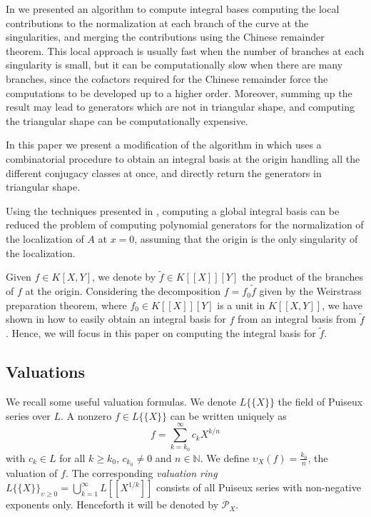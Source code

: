 \documentclass[a4paper,11pt]{amsart}%
\theoremstyle{definition}
\theoremstyle{plain}
\theoremstyle{remark}
\newcommand{\N}{{\mathbb N}}
\begin{document}
In \cite{intbas} we presented an algorithm to compute integral bases computing the local contributions to the normalization at each branch of the curve at the singularities, and merging the contributions using the Chinese remainder theorem. This local approach is usually fast when the number of branches at each singularity is small, but it can be computationally
slow when there are many branches, since the cofactors required for the Chinese remainder force the computations to be developed up to a higher order. Moreover, summing up the result may lead to generators which are not in triangular shape, and computing the triangular shape can be computationally expensive.

In this paper we present a modification of the algorithm in \cite{intbas} which uses a combinatorial procedure to obtain an integral basis at the origin
handling all the different conjugacy classes at once, and directly return the generators in triangular shape.

Using the techniques presented in \cite{intbas}, computing a global integral basis can be reduced the problem of computing polynomial generators for the normalization of the localization of $A$ at $x = 0$, assuming that the origin is the only singularity of the localization.



Given $f \in K[X,Y]$, we denote by $\tilde f \in K[[X]][Y]$ the product of the branches of $f$ at the origin. Considering the decomposition $f = f_0 \tilde f$ given by the Weirstrass preparation theorem, where $f_0 \in K[[X]][Y]$ is a unit in $K[[X,Y]]$, we have shown in \cite[Proposition 41]{intbas} how to easily obtain an integral basis for $f$ from an integral basis from $\tilde f$. Hence, we will focus in this paper on computing the integral basis for $\tilde f$.

\subsection{Valuations}

We recall some useful valuation formulas. We denote $L\{\{X\}\}$ the field of Puiseux series over $L$. A nonzero $f \in L\{\{X\}\}$ can be written uniquely as
$$
f = \sum_{k = k_0}^\infty c_k X^{k / n}
$$
with $c_k \in L$ for all $k \ge k_0$, $c_{k_0} \neq 0$ and $n \in \N$. We define $\upsilon_X(f) = \frac{k_0}{n}$, the valuation of $f$.
The corresponding \emph{valuation ring}
$L\{\{X\}\}_{\upsilon\geq0}=\bigcup_{k=1}^{\infty}L[[X^{1/k}]]$ consists of all Puiseux series
with non-negative exponents only. Henceforth it will be denoted by ${\mathcal{P}_{X}}$.
\end{document}
